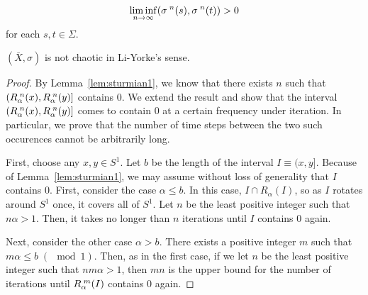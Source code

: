 \documentclass[10pt,twoside,draft]{book}
\begin{document}
\begin{example}
\begin{equation*}
    \liminf\limits_{n \to \infty} (\sigma^{\;n}(s), \sigma^{\;n}(t)) > 0
  \end{equation*}
  for each $s, t \in \Sigma$.
  \begin{proposition}
    $(\bar{X}, \sigma)$ is not chaotic in Li-Yorke's sense.
    \begin{proof}
    By Lemma~\ref{lem:sturmian1}, we know that there exists $n$ such that $(R_\alpha^{\;n}(x), R_\alpha^{\;n}(y)]$ contains $0$. %
  We extend the result and show that the interval $(R_\alpha^{\;n}(x), R_\alpha^{\;n}(y)]$ comes to contain $0$ at a certain frequency under iteration. %
  In particular, we prove that the number of time steps between the two such occurences cannot be arbitrarily long.

  First, choose any $x,y \in S^1$. %
  Let $b$ be the length of the interval $I \equiv (x,y]$. %
  Because of Lemma~\ref{lem:sturmian1}, we may assume without loss of generality that $I$ contains $0$.
  First, consider the case $\alpha \leq b$.
  In this case, $I \cap R_\alpha(I)$, so as $I$ rotates around $S^1$ once, it covers all of $S^1$.
  Let $n$ be the least positive integer such that $n\alpha > 1$.
  Then, it takes no longer than $n$ iterations until $I$ contains $0$ again.

  Next, consider the other case $\alpha > b$.
  There exists a positive integer $m$ such that $m\alpha \leq b \;(\mod{1})$.
  Then, as in the first case, if we let $n$ be the least positive integer such that $nm\alpha > 1$, then $mn$ is the upper bound for the number of iterations until $R_\alpha^{\;m}(I)$ contains $0$ again.


\end{proof}
\end{proposition}
\end{example}
\end{document}

